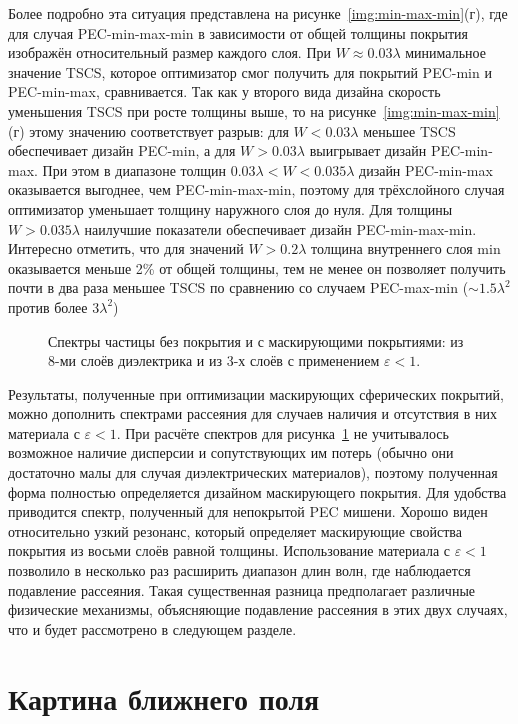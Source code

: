 Более подробно эта ситуация представлена на
рисунке~\ref{img:min-max-min}(г), где для случая PEC-min-max-min в
зависимости от общей толщины покрытия изображён относительный размер
каждого слоя. При $W\approx0.03\lambda$ минимальное значение TSCS,
которое оптимизатор смог получить для покрытий PEC-min и PEC-min-max,
сравнивается. Так как у второго вида дизайна скорость уменьшения TSCS
при росте толщины выше, то на рисунке~\ref{img:min-max-min}(г) этому значению
соответствует разрыв: для $W<0.03\lambda$ меньшее TSCS
обеспечивает дизайн PEC-min, а для $W>0.03\lambda$ выигрывает дизайн
PEC-min-max. При этом в диапазоне толщин
$0.03\lambda < W < 0.035\lambda$ дизайн PEC-min-max оказывается
выгоднее, чем PEC-min-max-min, поэтому для трёхслойного случая
оптимизатор уменьшает толщину наружного слоя до нуля. Для толщины
$W>0.035\lambda$ наилучшие показатели обеспечивает дизайн
PEC-min-max-min. Интересно отметить, что для значений 
$W>0.2\lambda$ толщина внутреннего слоя min оказывается меньше 2\% от
общей толщины, тем не менее он позволяет получить почти в два раза
меньшее TSCS по сравнению со случаем PEC-max-min ($\sim
1.5\lambda^2$ против более $3 \lambda^2$)

\begin{figure}[t]
  \centering
  \caption{ Спектры частицы без покрытия и с маскирующими
    покрытиями: из 8-ми слоёв диэлектрика и из 3-х слоёв с применением
    ${\varepsilon<1}$.\label{img:index07-spectra}
    }
\end{figure}
Результаты, полученные при оптимизации маскирующих сферических покрытий,
можно дополнить спектрами рассеяния для случаев наличия и отсутствия в них
материала с ${\varepsilon<1}$.  При
расчёте спектров для рисунка~\ref{img:index07-spectra} не учитывалось
возможное наличие дисперсии и сопутствующих им потерь (обычно они
достаточно малы для случая диэлектрических материалов), поэтому
полученная форма полностью определяется дизайном маскирующего
покрытия. Для удобства приводится спектр, полученный для непокрытой PEC
мишени.  Хорошо виден относительно узкий резонанс, который определяет
маскирующие свойства покрытия из восьми слоёв равной
толщины. Использование материала с ${\varepsilon<1}$ позволило в
несколько раз расширить диапазон длин волн, где наблюдается подавление
рассеяния.  Такая существенная разница предполагает различные
физические механизмы, объясняющие подавление рассеяния в этих двух
случаях, что и будет рассмотрено в следующем разделе.

\section{Картина ближнего поля}\label{sec:near-field}


